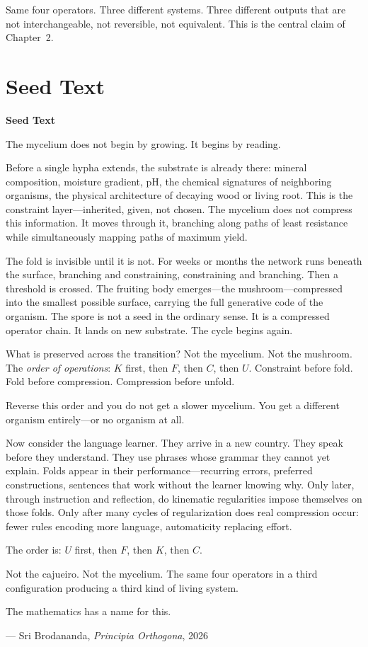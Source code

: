 \documentclass[11pt, twoside, openright]{book}
\theoremstyle{plain}
\theoremstyle{definition}
\newenvironment{seedbox}{%
  \begin{mdframed}[backgroundcolor=SeedBox,linecolor=PrincipiaDark!60,linewidth=0.5pt,innertopmargin=6pt,innerbottommargin=6pt]
  \noindent\textbf{Seed Text}\par\medskip}{\end{mdframed}}
\begin{document}
\medskip
Same four operators. Three different systems. Three different outputs
that are not interchangeable, not reversible, not equivalent. This is
the central claim of Chapter~2.

\section{Seed Text}

\begin{seedbox}
The mycelium does not begin by growing. It begins by reading.

Before a single hypha extends, the substrate is already there: mineral
composition, moisture gradient, pH, the chemical signatures of
neighboring organisms, the physical architecture of decaying wood or
living root. This is the constraint layer---inherited, given, not chosen.
The mycelium does not compress this information. It moves through it,
branching along paths of least resistance while simultaneously mapping
paths of maximum yield.

The fold is invisible until it is not. For weeks or months the network
runs beneath the surface, branching and constraining, constraining and
branching. Then a threshold is crossed. The fruiting body emerges---the
mushroom---compressed into the smallest possible surface, carrying the
full generative code of the organism. The spore is not a seed in the
ordinary sense. It is a compressed operator chain. It lands on new
substrate. The cycle begins again.

What is preserved across the transition? Not the mycelium. Not the
mushroom. The \textit{order of operations}: $K$ first, then $F$, then $C$, then $U$.
Constraint before fold. Fold before compression. Compression before
unfold.

Reverse this order and you do not get a slower mycelium. You get a
different organism entirely---or no organism at all.

\medskip
Now consider the language learner. They arrive in a new country. They
speak before they understand. They use phrases whose grammar they cannot
yet explain. Folds appear in their performance---recurring errors,
preferred constructions, sentences that work without the learner knowing
why. Only later, through instruction and reflection, do kinematic
regularities impose themselves on those folds. Only after many cycles of
regularization does real compression occur: fewer rules encoding more
language, automaticity replacing effort.

The order is: $U$ first, then $F$, then $K$, then $C$.

Not the cajueiro. Not the mycelium. The same four operators in a third
configuration producing a third kind of living system.

The mathematics has a name for this.

\begin{flushright}
--- Sri Brodananda, \textit{Principia Orthogona}, 2026
\end{flushright}
\end{seedbox}
\end{document}
